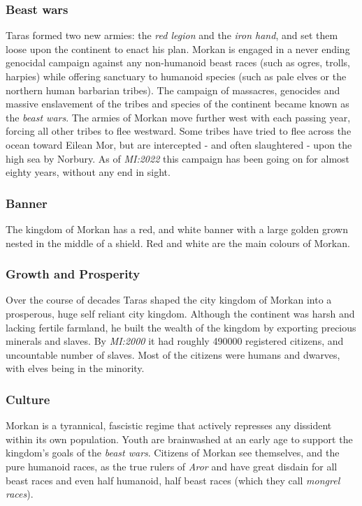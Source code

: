 \subsubsection{Beast wars}

Taras formed two new armies: the \emph{red legion} and the \emph{iron
  hand}, and set them loose upon the continent to enact his plan. Morkan is
engaged in a never ending genocidal campaign against any non-humanoid beast
races (such as ogres, trolls, harpies) while offering sanctuary to humanoid
species (such as pale elves or the northern human barbarian tribes). The
campaign of massacres, genocides and massive enslavement of the tribes and
species of the continent became known as the \emph{beast wars}. The armies of
Morkan move further west with each passing year, forcing all other tribes
to flee westward. Some tribes have tried to flee across the ocean toward
Eilean Mor, but are intercepted - and often slaughtered - upon the high sea
by Norbury. As of \emph{MI:2022} this campaign has been going on for almost
eighty years, without any end in sight.

\subsubsection{Banner}

The kingdom of Morkan has a red, and white banner with a large golden grown
nested in the middle of a shield. Red and white are the main colours of
Morkan.

\subsubsection{Growth and Prosperity}

Over the course of decades Taras shaped the city kingdom of Morkan into a
prosperous, huge self reliant city kingdom. Although the continent was harsh
and lacking fertile farmland, he built the wealth of the kingdom by exporting
precious minerals and slaves. By \emph{MI:2000} it had roughly 490000
registered citizens, and uncountable number of slaves. Most of the citizens
were humans and dwarves, with elves being in the minority.

\subsubsection{Culture}

Morkan is a tyrannical, fascistic regime that actively represses any dissident
within its own population. Youth are brainwashed at an early age to support
the kingdom's goals of the \emph{beast wars}. Citizens of Morkan see
themselves, and the pure humanoid races, as the true rulers of \emph{Aror} and
have great disdain for all beast races and even half humanoid, half beast races
(which they call \emph{mongrel races}).


